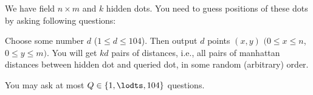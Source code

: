 
We have field $n \times m$ and $k$ hidden dots.
You need to guess positions of these dots by asking following questions:


Choose some number $d$ ($1 \leq d \leq 104$).
Then output $d$ points $(x, y)$  $(0 \leq x \leq n$, $0 \leq y \leq m)$.
You will get $kd$ pairs of distances, i.e., all pairs of manhattan distances between hidden dot and queried dot, in some random (arbitrary) order.

You may ask at most $Q\in\{1,\lodts,  104\}$ questions.
